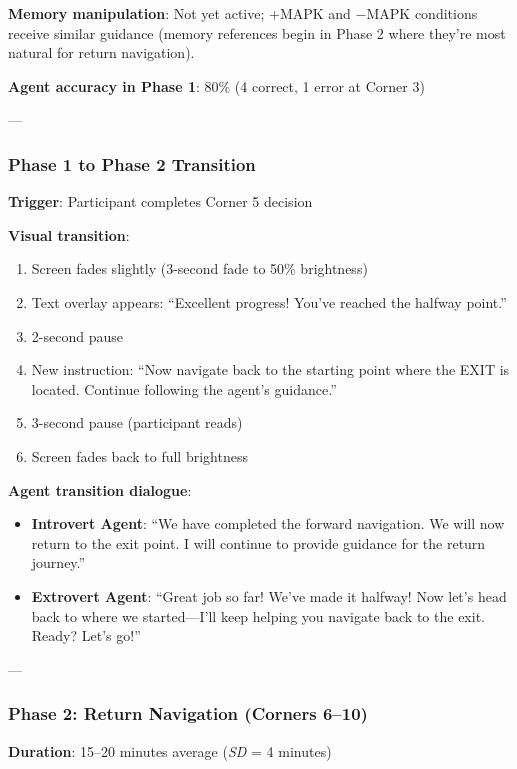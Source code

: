 \documentclass[12pt]{article}
\begin{document}
\textbf{Memory manipulation}: Not yet active; +MAPK and $-$MAPK conditions receive similar guidance (memory references begin in Phase 2 where they're most natural for return navigation).

\textbf{Agent accuracy in Phase 1}: 80\% (4 correct, 1 error at Corner 3)

---

\subsubsection{Phase 1 to Phase 2 Transition}

\textbf{Trigger}: Participant completes Corner 5 decision

\textbf{Visual transition}:
\begin{enumerate}
    \item Screen fades slightly (3-second fade to 50\% brightness)
    \item Text overlay appears: ``Excellent progress! You've reached the halfway point.''
    \item 2-second pause
    \item New instruction: ``Now navigate back to the starting point where the EXIT is located. Continue following the agent's guidance.''
    \item 3-second pause (participant reads)
    \item Screen fades back to full brightness
\end{enumerate}

\textbf{Agent transition dialogue}:
\begin{itemize}
    \item \textbf{Introvert Agent}: ``We have completed the forward navigation. We will now return to the exit point. I will continue to provide guidance for the return journey.''
    
    \item \textbf{Extrovert Agent}: ``Great job so far! We've made it halfway! Now let's head back to where we started---I'll keep helping you navigate back to the exit. Ready? Let's go!''
\end{itemize}

---

\subsubsection{Phase 2: Return Navigation (Corners 6--10)}

\textbf{Duration}: 15--20 minutes average (\textit{SD} = 4 minutes)
\end{document}
